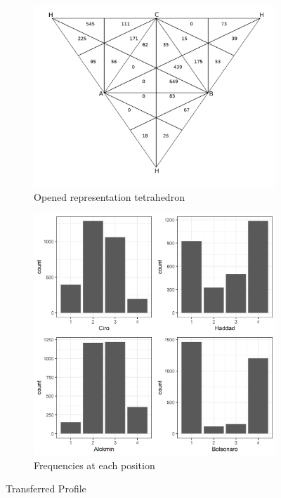\documentclass[hidelinks,11pt]{article}
\begin{document}
\begin{figure}[H]
  \centering
  \begin{subfigure}[b]{0.49\textwidth}
    \centering
\includegraphics[width=\textwidth]{./images/representation_tetrahedron.png}
 \caption{Opened representation tetrahedron}
 \label{fig:rep_ot}
\end{subfigure}
  \hfill
  \begin{subfigure}[b]{0.49\textwidth}
    \centering
\includegraphics[width=\textwidth]{./images/corrected1_indexes_plot.png}
 \caption{Frequencies at each position}
 \label{fig:counts}
\end{subfigure}
\caption{Transferred Profile}
\label{fig:profile_trans}
\end{figure}
\end{document}
